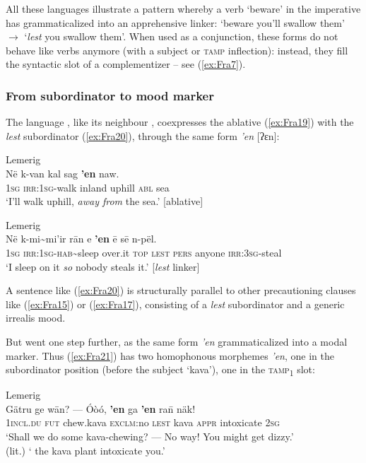 \documentclass[output=paper,colorlinks,citecolor=brown]{langscibook}
\begin{document}
All these languages illustrate a pattern whereby a verb `beware' in the imperative has grammaticalized into an apprehensive linker: `beware you'll swallow them' $\rightarrow$ `\textit{lest} you swallow them'. When used as a conjunction, these forms do not behave like verbs anymore (with a subject or \textsc{tamp} inflection): instead, they fill the syntactic slot of a complementizer -- see (\ref{ex:Fra7}).
 

\subsubsection{From subordinator to mood marker}
\label{subsubsec:subtomood}

The language , like its neighbour , coexpresses the ablative (\ref{ex:Fra19}) with the \textit{lest} subordinator (\ref{ex:Fra20}), through the same form \textit{'en} [ʔɛn]:

\ea \label{ex:Fra19} \textnormal{Lemerig} \\
\gll Në k-van kal sag \textbf{'en} naw. \\
\textsc{1sg} \textsc{irr:1sg}-walk inland uphill \textsc{abl} sea \\
\glt `I'll walk uphill, \textit{away from} the sea.' \hfill [ablative] 
\z

\ea \label{ex:Fra20} \textnormal{Lemerig}  \\
\gll Në k-mi\textasciitilde mi'ir rān e \textbf{'en} ē sē n-pël. \\
\textsc{1sg} \textsc{irr:1sg}-\textsc{hab}\textasciitilde sleep over.it \textsc{top} \textsc{lest} \textsc{pers} anyone \textsc{irr:3sg}-steal \\
\glt `I sleep on it \textit{so} nobody steals it.' \hfill [\textit{lest} linker] 
\z

\noindent A sentence like (\ref{ex:Fra20}) is structurally parallel to other precautioning clauses like (\ref{ex:Fra15}) or (\ref{ex:Fra17}), consisting of a \textit{lest} subordinator and a generic irrealis mood.

But  went one step further, as the same form  \textit{'en} grammaticalized into a modal marker. Thus (\ref{ex:Fra21}) has two homophonous morphemes  \textit{'en}, one in the subordinator position (before the subject `kava'), one in the \textsc{tamp}\textsc{\textsubscript{1}} slot:

\ea \label{ex:Fra21} \textnormal{Lemerig} \\
\gll Gätru ge wān? --- Óòó, \textbf{'en} ga \textbf{'en} ra\={n}  näk! \\
\textsc{1incl.du} \textsc{fut} chew.kava {} \textsc{exclm}:no \textsc{lest} kava \textsc{appr} intoxicate \textsc{2sg} \\
\glt `Shall we do some kava-chewing? --- No way!  You might get dizzy.' \\
(lit.) ` the kava plant  intoxicate you.' 
\z
\end{document}
